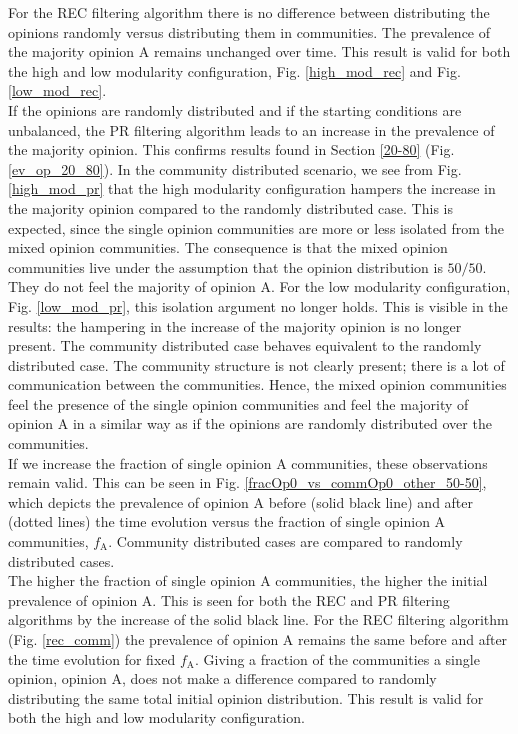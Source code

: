 \documentclass[11 pt , letterpaper , twoside , openright]{book}
\begin{document}
\newline
For the REC filtering algorithm there is no difference between distributing the opinions randomly versus distributing them in communities. The prevalence of the majority opinion A remains unchanged over time. This result is valid for both the high and low modularity configuration, Fig. \ref{high_mod_rec} and Fig. \ref{low_mod_rec}.\\
\newline
If the opinions are randomly distributed and if the starting conditions are unbalanced, the PR filtering algorithm leads to an increase in the prevalence of the majority opinion. This confirms results found in Section \ref{20-80} (Fig. \ref{ev_op_20_80}). In the community distributed scenario, we see from Fig. \ref{high_mod_pr} that the high modularity configuration hampers the increase in the majority opinion compared to the randomly distributed case. This is expected, since the single opinion communities are more or less isolated from the mixed opinion communities. The consequence is that the mixed opinion communities live under the assumption that the opinion distribution is $50/50$. They do not feel the majority of opinion A. For the low modularity configuration, Fig. \ref{low_mod_pr}, this isolation argument no longer holds. This is visible in the results: the hampering in the increase of the majority opinion is no longer present. The community distributed case behaves equivalent to the randomly distributed case. The community structure is not clearly present; there is a lot of communication between the communities. Hence, the mixed opinion communities feel the presence of the single opinion communities and feel the majority of opinion A in a similar way as if the opinions are randomly distributed over the communities.\\
\newline
If we increase the fraction of single opinion A communities, these observations remain valid. This can be seen in Fig. \ref{fracOp0_vs_commOp0_other_50-50}, which depicts the prevalence of opinion A before (solid black line) and after (dotted lines) the time evolution versus the fraction of single opinion A communities, $f_\text{A}$. Community distributed cases are compared to randomly distributed cases.\\
\newline
The higher the fraction of single opinion A communities, the higher the initial prevalence of opinion A. This is seen for both the REC and PR filtering algorithms by the increase of the solid black line. For the REC filtering algorithm (Fig. \ref{rec_comm}) the prevalence of opinion A remains the same before and after the time evolution for fixed $f_\text{A}$. Giving a fraction of the communities a single opinion, opinion A, does not make a difference compared to randomly distributing the same total initial opinion distribution. This result is valid for both the high and low modularity configuration.\\
\end{document}
